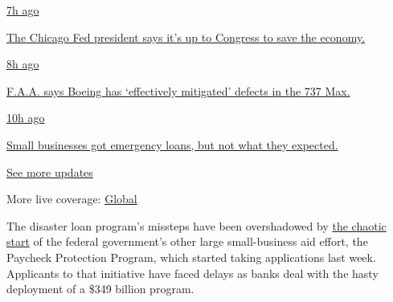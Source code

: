 \href{https://www.nytimes.com/live/2020/08/03/business/stock-market-today-coronavirus?action=click\&pgtype=Article\&state=default\&region=MAIN_CONTENT_1\&context=storylines_live_updates\#the-chicago-fed-president-says-its-up-to-congress-to-save-the-economy}{7h
ago}

\href{https://www.nytimes.com/live/2020/08/03/business/stock-market-today-coronavirus?action=click\&pgtype=Article\&state=default\&region=MAIN_CONTENT_1\&context=storylines_live_updates\#the-chicago-fed-president-says-its-up-to-congress-to-save-the-economy}{The
Chicago Fed president says it's up to Congress to save the economy.}

\href{https://www.nytimes.com/live/2020/08/03/business/stock-market-today-coronavirus?action=click\&pgtype=Article\&state=default\&region=MAIN_CONTENT_1\&context=storylines_live_updates\#faa-says-boeing-has-effectively-mitigated-defects-in-the-737-max}{8h
ago}

\href{https://www.nytimes.com/live/2020/08/03/business/stock-market-today-coronavirus?action=click\&pgtype=Article\&state=default\&region=MAIN_CONTENT_1\&context=storylines_live_updates\#faa-says-boeing-has-effectively-mitigated-defects-in-the-737-max}{F.A.A.
says Boeing has `effectively mitigated' defects in the 737 Max.}

\href{https://www.nytimes.com/live/2020/08/03/business/stock-market-today-coronavirus?action=click\&pgtype=Article\&state=default\&region=MAIN_CONTENT_1\&context=storylines_live_updates\#small-businesses-got-emergency-loans-but-not-what-they-expected}{10h
ago}

\href{https://www.nytimes.com/live/2020/08/03/business/stock-market-today-coronavirus?action=click\&pgtype=Article\&state=default\&region=MAIN_CONTENT_1\&context=storylines_live_updates\#small-businesses-got-emergency-loans-but-not-what-they-expected}{Small
businesses got emergency loans, but not what they expected.}

\href{https://www.nytimes.com/live/2020/08/03/business/stock-market-today-coronavirus?action=click\&pgtype=Article\&state=default\&region=MAIN_CONTENT_1\&context=storylines_live_updates}{See
more updates}

More live coverage:
\href{https://www.nytimes.com/2020/08/03/world/coronavirus-covid-19.html?action=click\&pgtype=Article\&state=default\&region=MAIN_CONTENT_1\&context=storylines_live_updates}{Global}

The disaster loan program's missteps have been overshadowed by
\href{https://www.nytimes.com/2020/04/07/business/coronavirus-ppp-small-business-aid.html}{the
chaotic start} of the federal government's other large small-business
aid effort, the Paycheck Protection Program, which started taking
applications last week. Applicants to that initiative have faced delays
as banks deal with the hasty deployment of a \$349 billion program.

